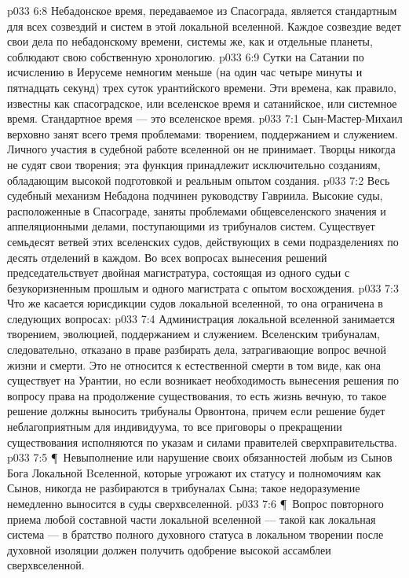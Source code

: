\vs p033 6:8 Небадонское время, передаваемое из Спасограда, является стандартным для всех созвездий и систем в этой локальной вселенной. Каждое созвездие ведет свои дела по небадонскому времени, системы же, как и отдельные планеты, соблюдают свою собственную хронологию.
\vs p033 6:9 Сутки на Сатании по исчислению в Иерусеме немногим меньше (на один час четыре минуты и пятнадцать секунд) трех суток урантийского времени. Эти времена, как правило, известны как спасоградское, или вселенское время и сатанийское, или системное время. Стандартное время --- это вселенское время.
\vs p033 7:1 Сын\hyp{}Мастер\hyp{}Михаил верховно занят всего тремя проблемами: творением, поддержанием и служением. Личного участия в судебной работе вселенной он не принимает. Творцы никогда не судят свои творения; эта функция принадлежит исключительно созданиям, обладающим высокой подготовкой и реальным опытом создания.
\vs p033 7:2 Весь судебный механизм Небадона подчинен руководству Гавриила. Высокие суды, расположенные в Спасограде, заняты проблемами общевселенского значения и аппеляционными делами, поступающими из трибуналов систем. Существует семьдесят ветвей этих вселенских судов, действующих в семи подразделениях по десять отделений в каждом. Во всех вопросах вынесения решений председательствует двойная магистратура, состоящая из одного судьи с безукоризненным прошлым и одного магистрата с опытом восхождения.
\vs p033 7:3 Что же касается юрисдикции судов локальной вселенной, то она ограничена в следующих вопросах:
\vs p033 7:4 \bibnobreakspace Администрация локальной вселенной занимается творением, эволюцией, поддержанием и служением. Вселенским трибуналам, следовательно, отказано в праве разбирать дела, затрагивающие вопрос вечной жизни и смерти. Это не относится к естественной смерти в том виде, как она существует на Урантии, но если возникает необходимость вынесения решения по вопросу права на продолжение существования, то есть жизнь вечную, то такое решение должны выносить трибуналы Орвонтона, причем если решение будет неблагоприятным для индивидуума, то все приговоры о прекращении существования исполняются по указам и силами правителей сверхправительства.
\vs p033 7:5 \P\ \bibnobreakspace Невыполнение или нарушение своих обязанностей любым из Сынов Бога Локальной Bселенной, которые угрожают их статусу и полномочиям как Сынов, никогда не разбираются в трибуналах Сына; такое недоразумение немедленно выносится в суды сверхвселенной.
\vs p033 7:6 \P\ \bibnobreakspace Вопрос повторного приема любой составной части локальной вселенной --- такой как локальная система --- в братство полного духовного статуса в локальном творении после духовной изоляции должен получить одобрение высокой ассамблеи сверхвселенной.

